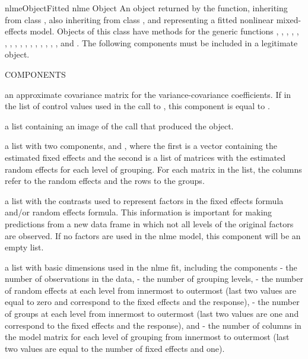\documentclass[pdftex]{article} \usepackage{url,graphicx}
\begin{document}
\begin{Helpfile}{nlmeObject}{Fitted nlme Object}
An object returned by the  function, inheriting from class
, also inheriting from class , and representing a
fitted nonlinear mixed-effects model. Objects of this class have
methods for the generic functions  , ,
, , , ,
, , , ,
, , , ,
, , and .
The following components must be included in a legitimate 
object. 
\begin{Argument}{COMPONENTS}
\item[\Co{apVar:}]
an approximate covariance matrix for the
variance-covariance coefficients. If  in the list
of control values used in the call to , this
component is equal to .
\item[\Co{call:}]
a list containing an image of the  call that
produced the object.
\item[\Co{coefficients:}]
a list with two components,  and
, where the first is a vector containing the estimated
fixed effects and the second is a list of matrices with the estimated
random effects for each level of grouping. For each matrix in the
 list, the columns refer to the random effects and the
rows to the groups.
\item[\Co{contrasts:}]
a list with the contrasts used to represent factors
in the fixed effects formula  and/or random effects formula. This
information is important for making predictions from a new data
frame in which not all levels of the original factors are
observed. If no factors are used in the nlme model, this component
will be an empty list.
\item[\Co{dims:}]
a list with basic dimensions used in the nlme fit,
including the components  - the number of observations in
the data,  - the number of grouping levels,  -
the number of random effects at each level from innermost to
outermost (last two values are equal to zero and correspond to the
fixed effects and the response),  - the number of groups
at each level from innermost to outermost (last two values are one
and correspond to the fixed effects and the response), and
 - the number of columns in the model matrix for each
level of grouping from innermost to outermost (last two values are
equal to the number of fixed effects and one).

\end{Argument}
\end{Helpfile}
\end{document}

